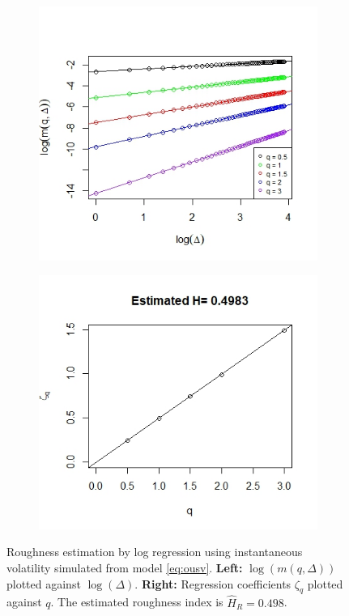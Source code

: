 \documentclass{article}
\begin{document}
\begin{figure}[htbp]
    \centering
    
    \begin{subfigure}{0.48\textwidth}
        \includegraphics[width=\linewidth]{ex6_logIV1.jpeg}
    \end{subfigure}
    \hfill
    \begin{subfigure}{0.48\textwidth}
        \includegraphics[width=\linewidth]{ex6_logIV2.jpeg}
    \end{subfigure}
    
    \caption{Roughness estimation by log regression using instantaneous volatility simulated from model \eqref{eq:ousv}. \textbf{Left:} $\log(m(q,\Delta))$ plotted against $\log(\Delta)$. \textbf{Right:} Regression coefficients $\zeta_q$ plotted against $q$. The estimated roughness index is $\hat{H}_R=0.498$.}
    \label{fig:ex6logIV}
\end{figure}\\\\
\end{document}

